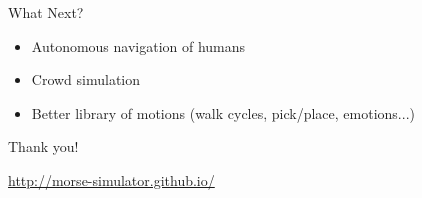 \documentclass[compress]{beamer}
\begin{document}
\begin{frame}{What Next?}
    \begin{itemize}
        \item<1-> Autonomous navigation of humans
        \item<2-> Crowd simulation
        \item<3-> Better library of motions (walk cycles, pick/place, emotions...)
    \end{itemize}

\end{frame}


\begin{frame}

    Thank you!

    \url{http://morse-simulator.github.io/}
\end{frame}
\end{document}
